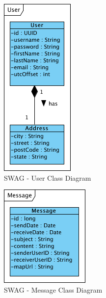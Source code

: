 \documentclass[11pt]{article}
\begin{document}
\begin{figure}[h]
\center
\includegraphics[scale=1]{diagrams/user.png}
\caption{SWAG - User Class Diagram}
\label{fig:user_cd}
\end{figure}

\begin{figure}[h]
\center
\includegraphics[scale=1]{diagrams/message.png}
\caption{SWAG - Message Class Diagram}
\label{fig:message_cd}
\end{figure}

 
\end{document}
